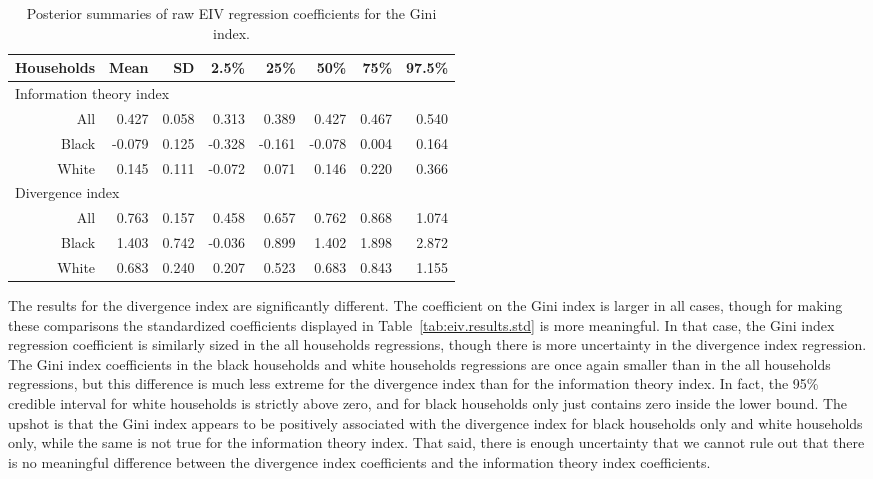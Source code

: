 \documentclass[12pt]{article}
\begin{document}
\begin{table}[ht]
  \centering
  \begin{tabular}{rrrrrrrr}
    \hline
    Households & Mean & SD & 2.5\% & 25\% & 50\% & 75\% & 97.5\% \\ 
    \hline
    \multicolumn{8}{l}{Information theory index} \\
    All   &  0.427 & 0.058 &  0.313 &  0.389 &  0.427 & 0.467 & 0.540 \\ 
    Black & -0.079 & 0.125 & -0.328 & -0.161 & -0.078 & 0.004 & 0.164 \\ 
    White &  0.145 & 0.111 & -0.072 &  0.071 &  0.146 & 0.220 & 0.366 \\ 
    \multicolumn{8}{l}{Divergence index} \\  
    All   & 0.763 & 0.157 &  0.458 & 0.657 & 0.762 & 0.868 & 1.074 \\ 
    Black & 1.403 & 0.742 & -0.036 & 0.899 & 1.402 & 1.898 & 2.872 \\ 
    White & 0.683 & 0.240 &  0.207 & 0.523 & 0.683 & 0.843 & 1.155 \\ 
    \hline
  \end{tabular}
  \caption{Posterior summaries of raw EIV regression coefficients for the Gini index.}
  \label{tab:eiv.results.raw}
\end{table}

The results for the divergence index are significantly different. The coefficient on the Gini index is larger in all cases, though for making these comparisons the standardized coefficients displayed in Table~\ref{tab:eiv.results.std} is more meaningful. In that case, the Gini index regression coefficient is similarly sized in the all households regressions, though there is more uncertainty in the divergence index regression. The Gini index coefficients in the black households and white households regressions are once again smaller than in the all households regressions, but this difference is much less extreme for the divergence index than for the information theory index. In fact, the 95\% credible interval for white households is strictly above zero, and for black households only just contains zero inside the lower bound. The upshot is that the Gini index appears to be positively associated with the divergence index for black households only and white households only, while the same is not true for the information theory index. That said, there is enough uncertainty that we cannot rule out that there is no meaningful difference between the divergence index coefficients and the information theory index coefficients.
\end{document}
